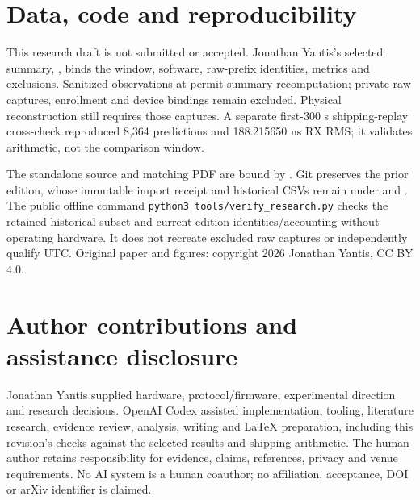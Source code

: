 \documentclass[11pt,letterpaper]{article}
\newcommand{\code}[1]{\texttt{#1}}\newcolumntype{L}[1]{>{\RaggedRight\arraybackslash}p{#1}}
\begin{document}
\section*{Data, code and reproducibility}
This research draft is not submitted or accepted. Jonathan Yantis's selected summary, , binds the window, software, raw-prefix identities, metrics and exclusions. Sanitized observations at  permit summary recomputation; private raw captures, enrollment and device bindings remain excluded. Physical reconstruction still requires those captures. A separate first-300 s shipping-replay cross-check reproduced 8,364 predictions and 188.215650 ns RX RMS; it validates arithmetic, not the comparison window.

The standalone source and matching PDF are bound by . Git preserves the prior edition, whose immutable import receipt and historical CSVs remain under  and . The public offline command \code{python3 tools/verify\_research.py} checks the retained historical subset and current edition identities/accounting without operating hardware. It does not recreate excluded raw captures or independently qualify UTC. Original paper and figures: copyright 2026 Jonathan Yantis, CC BY 4.0.

\section*{Author contributions and assistance disclosure}
Jonathan Yantis supplied hardware, protocol/firmware, experimental direction and research decisions. OpenAI Codex assisted implementation, tooling, literature research, evidence review, analysis, writing and LaTeX preparation, including this revision's checks against the selected results and shipping arithmetic. The human author retains responsibility for evidence, claims, references, privacy and venue requirements. No AI system is a human coauthor; no affiliation, acceptance, DOI or arXiv identifier is claimed.
\end{document}
